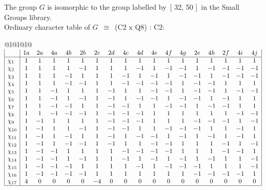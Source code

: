 \documentclass[varwidth=\maxdimen,border=10]{standalone}
\begin{document}
The group $G$ is isomorphic to the group labelled by\ [ 32, 50 ]\ in the Small Groups library.\\
Ordinary character table of $G$\ $\cong$\ (C2 x Q8) : C2:\\
\begin{center}
\begin{tabular}{@{}l@{}l@{}l@{}}
\hline
\(\begin{array}{|l|ccccccccccccccccc|}
  & 1a & 2a & 4a & 4b & 2b & 2c & 2d & 4c & 4d & 4e & 4f & 4g & 2e & 4h & 2f & 4i & 4j\\ \hline
\chi_{1} & 1 & 1 & 1 & 1 & 1 & 1 & 1 & 1 & 1 & 1 & 1 & 1 & 1 & 1 & 1 & 1 & 1\\
\chi_{2} & 1 & 1 & 1 & 1 & -1 & 1 & 1 & 1 & -1 & 1 & -1 & -1 & 1 & -1 & -1 & -1 & -1\\
\chi_{3} & 1 & 1 & 1 & -1 & 1 & 1 & 1 & -1 & 1 & -1 & 1 & -1 & -1 & 1 & -1 & -1 & -1\\
\chi_{4} & 1 & 1 & 1 & -1 & -1 & 1 & 1 & -1 & -1 & -1 & -1 & 1 & -1 & -1 & 1 & 1 & 1\\
\chi_{5} & 1 & 1 & -1 & 1 & 1 & 1 & -1 & 1 & 1 & -1 & -1 & 1 & -1 & -1 & 1 & -1 & -1\\
\chi_{6} & 1 & 1 & -1 & 1 & -1 & 1 & -1 & 1 & -1 & -1 & 1 & -1 & -1 & 1 & -1 & 1 & 1\\
\chi_{7} & 1 & 1 & -1 & -1 & 1 & 1 & -1 & -1 & 1 & 1 & -1 & -1 & 1 & -1 & -1 & 1 & 1\\
\chi_{8} & 1 & 1 & -1 & -1 & -1 & 1 & -1 & -1 & -1 & 1 & 1 & 1 & 1 & 1 & 1 & -1 & -1\\
\chi_{9} & 1 & -1 & 1 & 1 & 1 & 1 & -1 & -1 & -1 & 1 & 1 & 1 & -1 & -1 & -1 & 1 & -1\\
\chi_{10} & 1 & -1 & 1 & 1 & -1 & 1 & -1 & -1 & 1 & 1 & -1 & -1 & -1 & 1 & 1 & -1 & 1\\
\chi_{11} & 1 & -1 & 1 & -1 & 1 & 1 & -1 & 1 & -1 & -1 & 1 & -1 & 1 & -1 & 1 & -1 & 1\\
\chi_{12} & 1 & -1 & 1 & -1 & -1 & 1 & -1 & 1 & 1 & -1 & -1 & 1 & 1 & 1 & -1 & 1 & -1\\
\chi_{13} & 1 & -1 & -1 & 1 & 1 & 1 & 1 & -1 & -1 & -1 & -1 & 1 & 1 & 1 & -1 & -1 & 1\\
\chi_{14} & 1 & -1 & -1 & 1 & -1 & 1 & 1 & -1 & 1 & -1 & 1 & -1 & 1 & -1 & 1 & 1 & -1\\
\chi_{15} & 1 & -1 & -1 & -1 & 1 & 1 & 1 & 1 & -1 & 1 & -1 & -1 & -1 & 1 & 1 & 1 & -1\\
\chi_{16} & 1 & -1 & -1 & -1 & -1 & 1 & 1 & 1 & 1 & 1 & 1 & 1 & -1 & -1 & -1 & -1 & 1\\
\chi_{17} & 4 & 0 & 0 & 0 & 0 & -4 & 0 & 0 & 0 & 0 & 0 & 0 & 0 & 0 & 0 & 0 & 0\\
\hline
\end{array}\)\\
\end{tabular}
\end{center}
\end{document}
